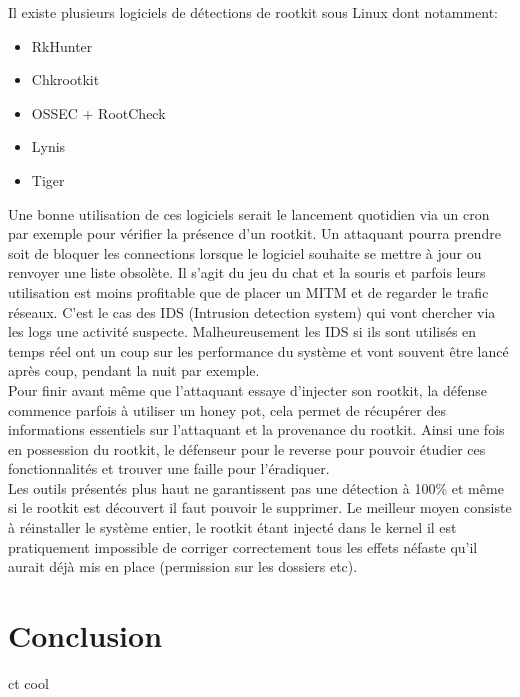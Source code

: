 \documentclass[12pt]{article}
\begin{document}
    Il existe plusieurs logiciels de détections de rootkit sous Linux dont notamment:
    \begin{itemize}
    	\item RkHunter
    	\item Chkrootkit
    	\item OSSEC + RootCheck
    	\item Lynis
    	\item Tiger
    \end{itemize}
    
    Une bonne utilisation de ces logiciels serait le lancement quotidien via un cron par exemple pour vérifier la présence d'un rootkit. Un attaquant pourra prendre soit de bloquer les connections lorsque le logiciel souhaite se mettre à jour ou renvoyer une liste obsolète. Il s'agit du jeu du chat et la souris et parfois leurs utilisation est moins profitable que de placer un MITM et de regarder le trafic réseaux. C'est le cas des IDS (Intrusion detection system) qui vont chercher via les logs une activité suspecte\cite{honeypot}. Malheureusement les IDS si ils sont utilisés en temps réel ont un coup sur les performance du système et vont souvent être lancé après coup, pendant la nuit par exemple. \\
    
    Pour finir avant même que l'attaquant essaye d'injecter son rootkit, la défense commence parfois à utiliser un honey pot\cite{honeypot}, cela permet de récupérer des informations essentiels sur l'attaquant et la provenance du rootkit. Ainsi une fois en possession du rootkit, le défenseur pour le reverse pour pouvoir étudier ces fonctionnalités et trouver une faille pour l'éradiquer. \\
    
   
    Les outils présentés plus haut ne garantissent pas une détection à 100\% et même si le rootkit est découvert il faut pouvoir le supprimer. Le meilleur moyen consiste à réinstaller le système entier, le rootkit étant injecté dans le kernel il est pratiquement impossible de corriger correctement tous les effets néfaste qu'il aurait déjà mis en place (permission sur les dossiers etc). 

\section*{Conclusion}
    ct cool
\end{document}
